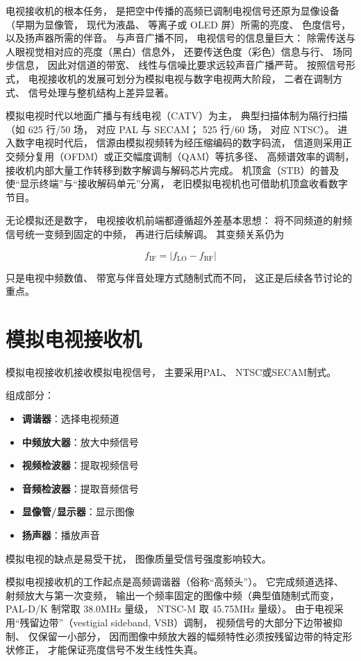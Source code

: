 电视接收机的根本任务，
是把空中传播的高频已调制电视信号还原为显像设备（早期为显像管，
现代为液晶、
等离子或 OLED 屏）所需的亮度、
色度信号，
以及扬声器所需的伴音。
与声音广播不同，
电视信号的信息量巨大：
除需传送与人眼视觉相对应的亮度（黑白）信息外，
还要传送色度（彩色）信息与行、
场同步信息，
因此对信道的带宽、
线性与信噪比要求远较声音广播严苛。
按照信号形式，
电视接收机的发展可划分为模拟电视与数字电视两大阶段，
二者在调制方式、
信号处理与整机结构上差异显著。

模拟电视时代以地面广播与有线电视（CATV）为主，
典型扫描体制为隔行扫描（如 625 行/50 场，
对应 PAL 与 SECAM；
525 行/60 场，
对应 NTSC）。
进入数字电视时代后，
信源由模拟视频转为经压缩编码的数字码流，
信道则采用正交频分复用（OFDM）或正交幅度调制（QAM）等抗多径、
高频谱效率的调制，
接收机内部大量工作转移到数字解调与解码芯片完成。
机顶盒（STB）的普及使“显示终端”与“接收解码单元”分离，
老旧模拟电视机也可借助机顶盒收看数字节目。

无论模拟还是数字，
电视接收机前端都遵循超外差基本思想：
将不同频道的射频信号统一变频到固定的中频，
再进行后续解调。
其变频关系仍为

\[
f_{\mathrm{IF}}=\left| f_{\mathrm{LO}}-f_{\mathrm{RF}} 
\right|
\]

只是电视中频数值、
带宽与伴音处理方式随制式而不同，
这正是后续各节讨论的重点。

\section{模拟电视接收机}
\label{sec:analog_tv_receiver}

模拟电视接收机接收模拟电视信号，
主要采用PAL、
NTSC或SECAM制式。

组成部分：
\begin{itemize}
    \item \textbf{调谐器}：选择电视频道
    \item \textbf{中频放大器}：放大中频信号
    \item \textbf{视频检波器}：提取视频信号
    \item \textbf{音频检波器}：提取音频信号
    \item \textbf{显像管/显示器}：显示图像
    \item \textbf{扬声器}：播放声音
\end{itemize}

模拟电视的缺点是易受干扰，
图像质量受信号强度影响较大。

模拟电视接收机的工作起点是高频调谐器（俗称“高频头”）。
它完成频道选择、
射频放大与第一次变频，
输出一个频率固定的图像中频（典型值随制式而变，
PAL-D/K 制常取 38.0MHz 量级，
NTSC-M 取 45.75MHz 量级）。
由于电视采用“残留边带”（vestigial sideband, VSB）调制，
视频信号的大部分下边带被抑制、
仅保留一小部分，
因而图像中频放大器的幅频特性必须按残留边带的特定形状修正，
才能保证亮度信号不发生线性失真。

